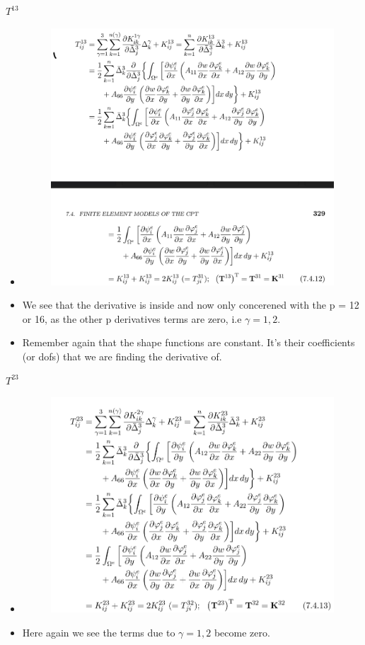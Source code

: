 	\begin{frame}{$T^{13}$}
		\begin{itemize}
			\item %
			\begin{figure}
				\centering
				\includegraphics[width=0.6\linewidth]{Figure/8}
				\label{fig:8}
			\end{figure}
			\item We see that the derivative is inside and now only concerened with the p = 12 or 16, as the other p derivatives terms are zero, i.e $\gamma = 1,2$. 
			\item Remember again that the shape functions are constant. It's their coefficients (or dofs) that we are finding the derivative of.
			
		\end{itemize}
	\end{frame}


	\begin{frame}{$T^{23}$}
		\begin{itemize}
			\item %
			\begin{figure}
				\centering
				\includegraphics[width=0.8\linewidth]{Figure/9}
				\label{fig:9}
			\end{figure}
			\item Here again we see the terms due to $\gamma = 1,2$ become zero.
			
			
		\end{itemize}
	\end{frame}


